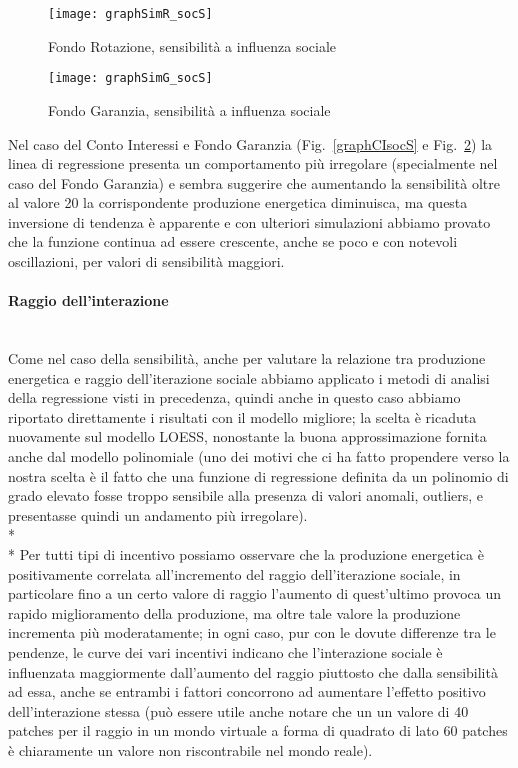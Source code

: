 \documentclass[12pt,a4paper,openright,twoside]{report}
\newcommand{\myparagraph}[1]{\paragraph{#1}\mbox{}\\}
\begin{document}
\begin{figure}[H]
	\centering
	\texttt{[image: graphSimR\_socS]}
	\caption{Fondo Rotazione, sensibilità a influenza sociale}
	\label{graphRsocS}
\end{figure}

\begin{figure}[hbt]
	\centering
	\texttt{[image: graphSimG\_socS]}
	\caption{Fondo Garanzia, sensibilità a influenza sociale}
	\label{graphGsocS}
\end{figure}

Nel caso del Conto Interessi e Fondo Garanzia (Fig.~\ref{graphCIsocS} e Fig.~\ref{graphGsocS}) la linea di regressione presenta un comportamento più irregolare (specialmente nel caso del Fondo Garanzia) e sembra suggerire che aumentando la sensibilità oltre al valore 20 la corrispondente produzione energetica diminuisca, ma questa inversione di tendenza è apparente e con ulteriori simulazioni abbiamo provato che la funzione continua ad essere crescente, anche se poco e con notevoli oscillazioni, per valori di sensibilità maggiori.

\myparagraph{Raggio dell'interazione}

Come nel caso della sensibilità, anche per valutare la relazione tra produzione energetica e raggio dell'iterazione sociale abbiamo applicato i metodi di analisi della regressione visti in precedenza, quindi anche in questo caso abbiamo riportato direttamente i risultati con il modello migliore; la scelta è ricaduta nuovamente sul modello LOESS, nonostante la buona approssimazione fornita anche dal modello polinomiale (uno dei motivi che ci ha fatto propendere verso la nostra scelta è il fatto che una funzione di regressione definita da un polinomio di grado elevato fosse troppo sensibile alla presenza di valori anomali, outliers, e presentasse quindi un andamento più irregolare).\\* \\*
Per tutti tipi di incentivo possiamo osservare che la produzione energetica è positivamente correlata all'incremento del raggio dell'iterazione sociale, in particolare fino a un certo valore di raggio l'aumento di quest'ultimo provoca un rapido miglioramento della produzione, ma oltre tale valore la produzione incrementa più moderatamente; in ogni caso, pur con le dovute differenze tra le pendenze, le curve dei vari incentivi indicano che l'interazione sociale è influenzata maggiormente dall'aumento del raggio piuttosto che dalla sensibilità ad essa, anche se entrambi i fattori concorrono ad aumentare l'effetto positivo dell'interazione stessa (può essere utile anche notare che un un valore di 40 patches per il raggio in un mondo virtuale a forma di quadrato di lato 60 patches è chiaramente un valore non riscontrabile nel mondo reale).
\end{document}
